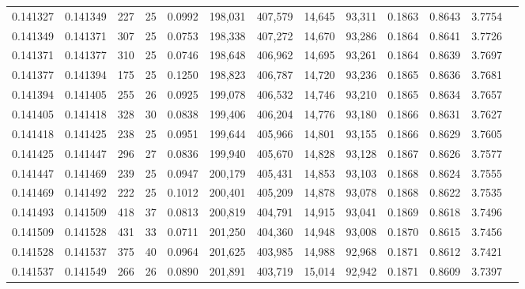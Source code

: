 \begin{tabular}{rrrrrrrrrrrrr}
0.141327 & 0.141349 & 227 &  25 &                                     0.0992 & 198,031 & 407,579 &  14,645 &  93,311 & 0.1863 & 0.8643 & 3.7754 \\
0.141349 & 0.141371 & 307 &  25 &                                     0.0753 & 198,338 & 407,272 &  14,670 &  93,286 & 0.1864 & 0.8641 & 3.7726 \\
0.141371 & 0.141377 & 310 &  25 &                                     0.0746 & 198,648 & 406,962 &  14,695 &  93,261 & 0.1864 & 0.8639 & 3.7697 \\
0.141377 & 0.141394 & 175 &  25 &                                     0.1250 & 198,823 & 406,787 &  14,720 &  93,236 & 0.1865 & 0.8636 & 3.7681 \\
0.141394 & 0.141405 & 255 &  26 &                                     0.0925 & 199,078 & 406,532 &  14,746 &  93,210 & 0.1865 & 0.8634 & 3.7657 \\
0.141405 & 0.141418 & 328 &  30 &                                     0.0838 & 199,406 & 406,204 &  14,776 &  93,180 & 0.1866 & 0.8631 & 3.7627 \\
0.141418 & 0.141425 & 238 &  25 &                                     0.0951 & 199,644 & 405,966 &  14,801 &  93,155 & 0.1866 & 0.8629 & 3.7605 \\
0.141425 & 0.141447 & 296 &  27 &                                     0.0836 & 199,940 & 405,670 &  14,828 &  93,128 & 0.1867 & 0.8626 & 3.7577 \\
0.141447 & 0.141469 & 239 &  25 &                                     0.0947 & 200,179 & 405,431 &  14,853 &  93,103 & 0.1868 & 0.8624 & 3.7555 \\
0.141469 & 0.141492 & 222 &  25 &                                     0.1012 & 200,401 & 405,209 &  14,878 &  93,078 & 0.1868 & 0.8622 & 3.7535 \\
0.141493 & 0.141509 & 418 &  37 &                                     0.0813 & 200,819 & 404,791 &  14,915 &  93,041 & 0.1869 & 0.8618 & 3.7496 \\
0.141509 & 0.141528 & 431 &  33 &                                     0.0711 & 201,250 & 404,360 &  14,948 &  93,008 & 0.1870 & 0.8615 & 3.7456 \\
0.141528 & 0.141537 & 375 &  40 &                                     0.0964 & 201,625 & 403,985 &  14,988 &  92,968 & 0.1871 & 0.8612 & 3.7421 \\
0.141537 & 0.141549 & 266 &  26 &                                     0.0890 & 201,891 & 403,719 &  15,014 &  92,942 & 0.1871 & 0.8609 & 3.7397 \\

\end{tabular}
